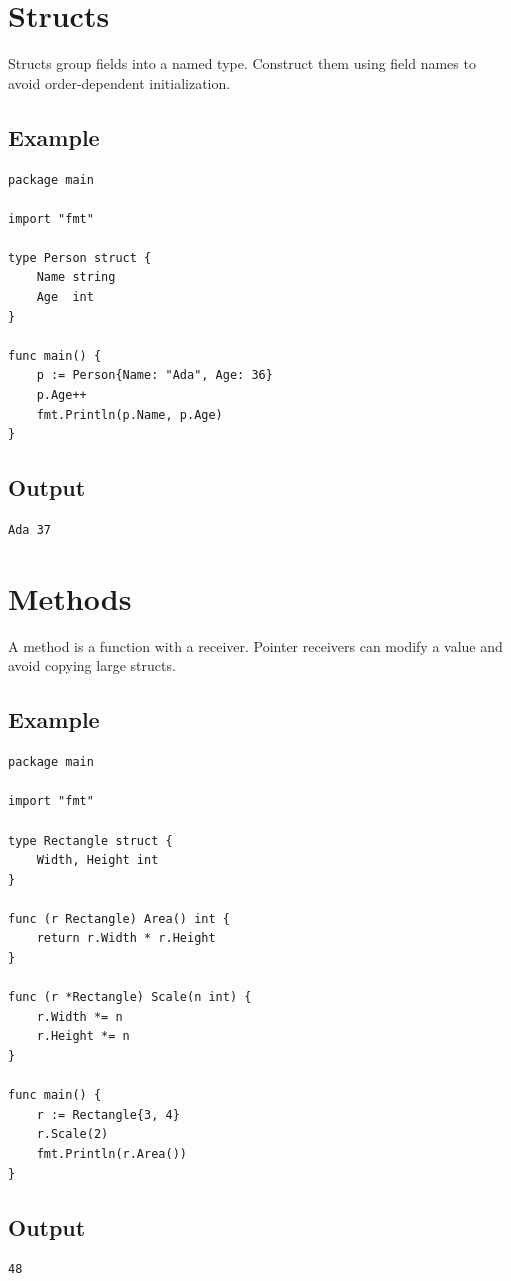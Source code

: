 \documentclass[10pt,oneside]{article}
\newcommand{\sectionline}{\par\vspace{4pt}{\color{rule}\hrule height .5pt}\vspace{7pt}\color{ink}\noindent}
\begin{document}
\section{Structs}
\sectionline
Structs group fields into a named type. Construct them using field names to avoid order-dependent initialization.\par
\subsection*{Example}
\begin{lstlisting}[style=gocode]
package main

import "fmt"

type Person struct {
	Name string
	Age  int
}

func main() {
	p := Person{Name: "Ada", Age: 36}
	p.Age++
	fmt.Println(p.Name, p.Age)
}
\end{lstlisting}
\subsection*{Output}
\begin{lstlisting}[style=terminal]
Ada 37
\end{lstlisting}
\clearpage
\section{Methods}
\sectionline
A method is a function with a receiver. Pointer receivers can modify a value and avoid copying large structs.\par
\subsection*{Example}
\begin{lstlisting}[style=gocode]
package main

import "fmt"

type Rectangle struct {
	Width, Height int
}

func (r Rectangle) Area() int {
	return r.Width * r.Height
}

func (r *Rectangle) Scale(n int) {
	r.Width *= n
	r.Height *= n
}

func main() {
	r := Rectangle{3, 4}
	r.Scale(2)
	fmt.Println(r.Area())
}
\end{lstlisting}
\subsection*{Output}
\begin{lstlisting}[style=terminal]
48
\end{lstlisting}
\clearpage
\end{document}
